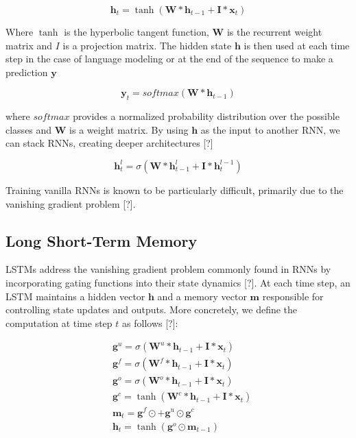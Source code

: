 \documentclass{article}
\begin{document}
\begin{equation}
	\boldsymbol h_t = \tanh(\boldsymbol W * \boldsymbol h_{t-1} + \boldsymbol I * \boldsymbol x_t) \nonumber
\end{equation}

Where $\tanh$ is the hyperbolic tangent function, $\boldsymbol W$ is the recurrent weight matrix and $I$ is a projection matrix. The hidden state $\boldsymbol h$ is then used at each time step in the case of language modeling or at the end of the sequence to make a prediction $\boldsymbol y$

\begin{equation}
	\boldsymbol y_t = softmax(\boldsymbol W * \boldsymbol h_{t-1}) \nonumber
\end{equation}

where $softmax$ provides a normalized probability distribution over the possible classes and $\boldsymbol W$ is a weight matrix. By using $\boldsymbol h$ as the input to another RNN, we can stack RNNs, creating deeper architectures [?]

\begin{equation}
	\boldsymbol h_t^{l} = \sigma(\boldsymbol W * \boldsymbol h_{t-1}^{l} + \boldsymbol I * \boldsymbol h_t^{l-1}) \nonumber
\end{equation}

Training vanilla RNNs is known to be particularly difficult, primarily due to the vanishing gradient problem [?].

\subsection{Long Short-Term Memory}
LSTMs address the vanishing gradient problem commonly found in RNNs by incorporating gating functions into their state dynamics [?]. At each time step, an LSTM maintains a hidden vector $\boldsymbol h$ and a memory vector $\boldsymbol m$  responsible for controlling state updates and outputs. More concretely, we define the computation at time step $t$ as follows [?]:

\begin{equation}
	\begin{split}
		& \boldsymbol g^u = \sigma(\boldsymbol W^u * \boldsymbol h_{t-1} + \boldsymbol I * \boldsymbol x_t) \\
		& \boldsymbol g^f = \sigma(\boldsymbol W^f * \boldsymbol h_{t-1} + \boldsymbol I * \boldsymbol x_t) \\
		& \boldsymbol g^o = \sigma(\boldsymbol W^o * \boldsymbol h_{t-1} + \boldsymbol I * \boldsymbol x_t) \\
		& \boldsymbol g^c = \tanh(\boldsymbol W^c * \boldsymbol h_{t-1} + \boldsymbol I * \boldsymbol x_t) \\
		& \boldsymbol m_t = \boldsymbol g^f \odot \boldsymbol +  \boldsymbol g^u \odot \boldsymbol g^c \\
		& \boldsymbol h_t = \tanh(\boldsymbol g^o \odot \boldsymbol m_{t-1}) \nonumber
	\end{split}
\end{equation}
\end{document}
